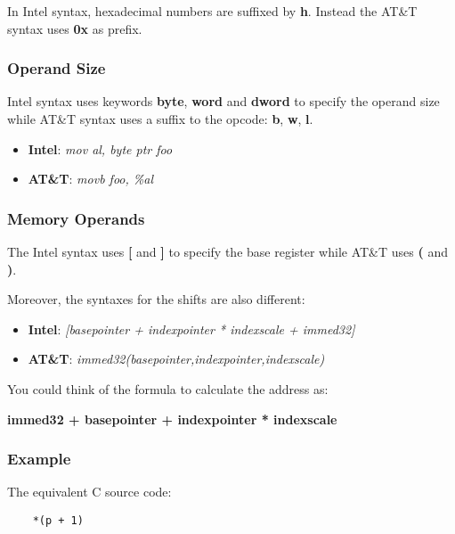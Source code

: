 {\begin{frame}
  \nl

  In Intel syntax, hexadecimal numbers are suffixed by \textbf{h}.
  Instead the AT\&T syntax uses \textbf{0x} as prefix.
\end{frame}


\begin{frame}
  \frametitle{Operand Size}

  Intel syntax uses keywords \textbf{byte}, \textbf{word} and
  \textbf{dword} to specify the operand size while AT\&T syntax uses
  a suffix to the opcode: \textbf{b}, \textbf{w}, \textbf{l}.

  \begin{itemize}
    \item
      \textbf{Intel}: \textit{mov al, byte ptr foo}
    \item
      \textbf{AT\&T}: \textit{movb foo, \%al}
  \end{itemize}
\end{frame}


\begin{frame}
  \frametitle{Memory Operands}

  The Intel syntax uses \textbf{[} and \textbf{]} to specify the
  base register while AT\&T uses \textbf{(} and \textbf{)}.

  \nl

  Moreover, the syntaxes for the shifts are also different:

  \begin{itemize}
    \item
      \textbf{Intel}:
      \textit{[basepointer + indexpointer * indexscale + immed32]}
    \item
      \textbf{AT\&T}: \textit{immed32(basepointer,indexpointer,indexscale)}
  \end{itemize}

  You could think of the formula to calculate the address as:

  \nl

  \textbf{immed32 + basepointer + indexpointer * indexscale}
\end{frame}


\begin{frame}[containsverbatim]
  \frametitle{Example}

  The equivalent C source code:

  \begin{verbatim}
    *(p + 1)
  \end{verbatim}


\end{frame}}

